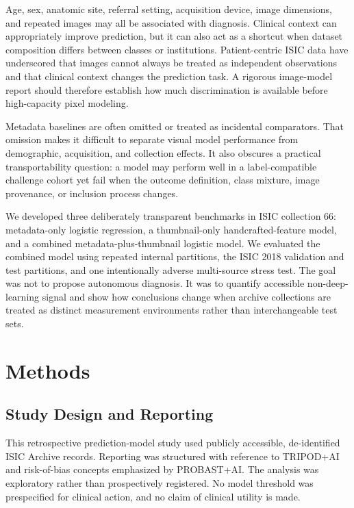 \documentclass[11pt]{article}
\begin{document}
Age, sex, anatomic site, referral setting, acquisition device, image dimensions, and repeated images may all be associated with diagnosis. Clinical context can appropriately improve prediction, but it can also act as a shortcut when dataset composition differs between classes or institutions. Patient-centric ISIC data have underscored that images cannot always be treated as independent observations and that clinical context changes the prediction task.\cite{rotemberg2021} A rigorous image-model report should therefore establish how much discrimination is available before high-capacity pixel modeling.

Metadata baselines are often omitted or treated as incidental comparators. That omission makes it difficult to separate visual model performance from demographic, acquisition, and collection effects. It also obscures a practical transportability question: a model may perform well in a label-compatible challenge cohort yet fail when the outcome definition, class mixture, image provenance, or inclusion process changes.

We developed three deliberately transparent benchmarks in ISIC collection 66: metadata-only logistic regression, a thumbnail-only handcrafted-feature model, and a combined metadata-plus-thumbnail logistic model. We evaluated the combined model using repeated internal partitions, the ISIC 2018 validation and test partitions, and one intentionally adverse multi-source stress test. The goal was not to propose autonomous diagnosis. It was to quantify accessible non-deep-learning signal and show how conclusions change when archive collections are treated as distinct measurement environments rather than interchangeable test sets.

\section{Methods}
\subsection{Study Design and Reporting}
This retrospective prediction-model study used publicly accessible, de-identified ISIC Archive records. Reporting was structured with reference to TRIPOD+AI and risk-of-bias concepts emphasized by PROBAST+AI.\cite{collins2024,moons2025} The analysis was exploratory rather than prospectively registered. No model threshold was prespecified for clinical action, and no claim of clinical utility is made.
\end{document}

